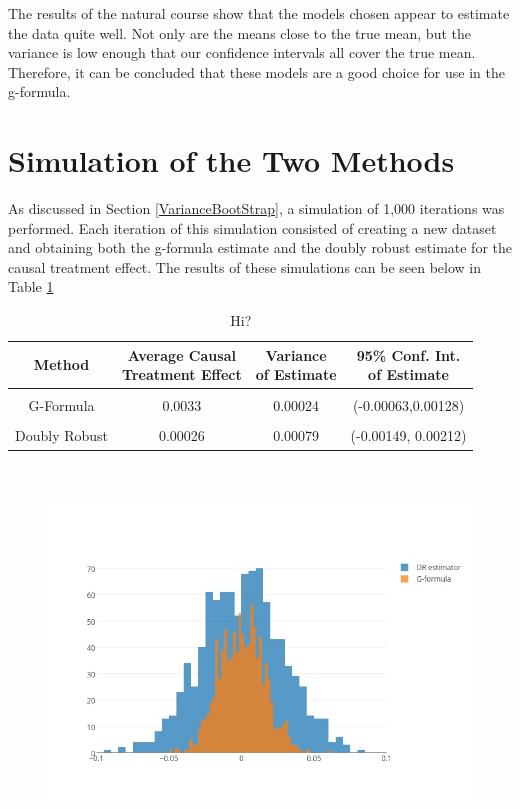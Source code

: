 The results of the natural course show that the models chosen appear to estimate the data quite well.  Not only are the means close to the true mean, but the variance is low enough that our confidence intervals all cover the true mean.  Therefore, it can be concluded that these models are a good choice for use in the g-formula.  

\section{Simulation of the Two Methods} 
As discussed in Section \ref{VarianceBootStrap}, a simulation of 1,000 iterations was performed.  Each iteration of this simulation consisted of creating a new dataset and obtaining both the g-formula estimate and the doubly robust estimate for the causal treatment effect.  The results of these simulations can be seen below in Table \ref{simdata} 

\begin{table}[h!]
\centering
\begin{tabular}{c | c c c }
Method & \shortstack{Average Causal \\ Treatment Effect} & \shortstack{Variance\\ of Estimate} & \shortstack{95\% Conf. Int.\\ of Estimate} \\ 
\hline \\
G-Formula & 0.0033 & 0.00024&(-0.00063,0.00128)\\ \\ 
Doubly Robust & 0.00026 &0.00079 & (-0.00149, 0.00212)
\end{tabular} \\
\centering
\caption{Hi? \label{simdata}}
\end{table}

\begin{figure}
\includegraphics[width = \linewidth]{figures/overlaid_histogram.jpeg}
\caption{}
\label{bighistogram}
\end{figure} 




